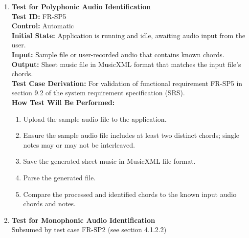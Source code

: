 \documentclass[12pt, titlepage]{article}
\begin{document}
\begin{enumerate}
    \item \textbf{Test for Polyphonic Audio Identification} \\
      \newline
      \textbf{Test ID:} FR-SP5 \\
      \textbf{Control:} Automatic \\
      \textbf{Initial State:} Application is running and idle, awaiting audio input from the user. \\
      \textbf{Input:} Sample file or user-recorded audio that contains known chords. \\
      \textbf{Output:} Sheet music file in MusicXML format that matches the input file’s chords. \\
      \textbf{Test Case Derivation:} For validation of functional requirement FR-SP5 in section 9.2 of the system requirement specification (SRS). \\
      \textbf{How Test Will Be Performed:}
      \begin{enumerate}
          \item Upload the sample audio file to the application.
          \item Ensure the sample audio file includes at least two distinct chords; single notes may or may not be interleaved.
          \item Save the generated sheet music in MusicXML file format.
          \item Parse the generated file.
          \item Compare the processed and identified chords to the known input audio chords and notes.
      \end{enumerate}
    \item \textbf{Test for Monophonic Audio Identification} \\
    Subsumed by test case FR-SP2 (see section 4.1.2.2)
  \end{enumerate}
\end{document}
